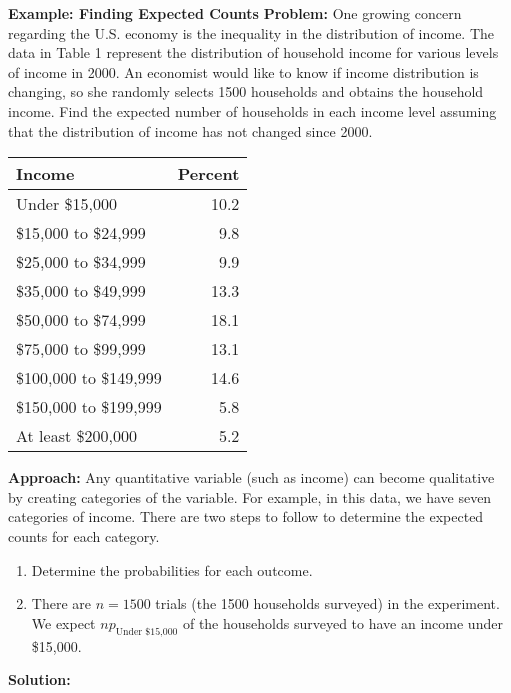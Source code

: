 \documentclass{report}
\begin{document}
    \bigbreak \noindent 
    \begin{mdframed}
      \textbf{Example: Finding Expected Counts}
      \bigbreak \noindent 
      \textbf{Problem:}
      One growing concern regarding the U.S. economy is the inequality in the distribution of income. The data in Table 1 represent the distribution of household income for various levels of income in 2000. An economist would like to know if income distribution is changing, so she randomly selects 1500 households and obtains the household income. Find the expected number of households in each income level assuming that the distribution of income has not changed since 2000.
      \bigbreak \noindent 
      \begin{center}
          \begin{tabular}{l r}
            \textbf{Income} & \textbf{Percent} \\
            \hline
            Under \$15,000 & 10.2 \\
            \$15,000 to \$24,999 & 9.8 \\
            \$25,000 to \$34,999 & 9.9 \\
            \$35,000 to \$49,999 & 13.3 \\
            \$50,000 to \$74,999 & 18.1 \\
            \$75,000 to \$99,999 & 13.1 \\
            \$100,000 to \$149,999 & 14.6 \\
            \$150,000 to \$199,999 & 5.8 \\
            At least \$200,000 & 5.2 \\
        \end{tabular}
      \end{center}
      \bigbreak \noindent 
      \textbf{Approach:}
      Any quantitative variable (such as income) can become qualitative by creating categories of the variable. For example, in this data, we have seven categories of income. There are two steps to follow to determine the expected counts for each category.
      \begin{enumerate}
          \item  Determine the probabilities for each outcome.
        \item There are \(n = 1500\) trials (the 1500 households surveyed) in the experiment. We expect \(np_{\text{Under \$15,000}}\) of the households surveyed to have an income under \$15,000.
      \end{enumerate}
      \bigbreak \noindent 
      \textbf{Solution:}

\end{mdframed}
\end{document}
